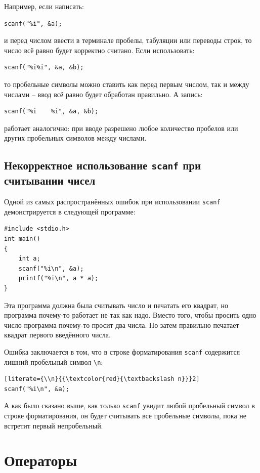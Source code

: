 \documentclass[10pt]{article}
\begin{document}
Например, если написать:
\begin{lstlisting}
scanf("%i", &a);
\end{lstlisting}
и перед числом ввести в терминале пробелы, табуляции или переводы строк, то число всё равно будет корректно считано. Если использовать:
\begin{lstlisting}
scanf("%i%i", &a, &b);
\end{lstlisting}
то пробельные символы можно ставить как перед первым числом, так и между числами -- ввод всё равно будет обработан правильно. А запись:
\begin{lstlisting}
scanf("%i    %i", &a, &b);
\end{lstlisting}
работает аналогично: при вводе разрешено любое количество пробелов или других пробельных символов между числами.


\subsection*{Некорректное использование \texttt{scanf} при считывании чисел}
Одной из самых распространённых ошибок при использовании \texttt{scanf} демонстрируется в следующей программе:
\begin{lstlisting}
#include <stdio.h>
int main()
{
    int a;
    scanf("%i\n", &a);
    printf("%i\n", a * a);
}
\end{lstlisting}
Эта программа должна была считывать число и печатать его квадрат, но программа почему-то работает не так как надо. Вместо того, чтобы просить одно число программа почему-то просит два числа. Но затем правильно печатает квадрат первого введённого числа.

\noindent Ошибка заключается в том, что в строке форматирования \texttt{scanf} содержится лишний пробельный символ \texttt{\textbackslash n}:
\begin{lstlisting}[literate={\\n}{{\textcolor{red}{\textbackslash n}}}2]
scanf("%i\n", &a);
\end{lstlisting}
А как было сказано выше, как только \texttt{scanf} увидит любой пробельный символ в строке форматирования, он будет считывать все пробельные символы, пока не встретит первый непробельный.


\newpage
\section*{Операторы}
\end{document}
